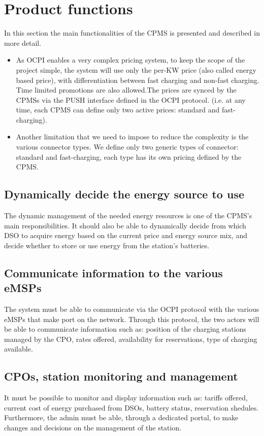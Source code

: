 \clearpage
\newpage


\section{Product functions}
In this section the main functionalities of the CPMS is presented and described in more detail.\\

\begin{itemize}
	\item As OCPI enables a very complex pricing system, to keep the scope of the project simple, the system will use only the per-KW price (also called energy based price), with differentiation between fast charging and non-fast charging. Time limited promotions are also allowed.The prices are synced by the CPMSs via the PUSH interface defined in the OCPI protocol. (i.e. at any time, each CPMS can define only two active prices: standard and fast-charging). 
	\item Another limitation that we need to impose to reduce the complexity is the various connector types. We define only two generic types of connector: standard and fast-charging, each type has its own pricing defined by the CPMS.
\end{itemize}

\subsection{Dynamically decide the energy source to use}
The dynamic management of the needed energy resources is one of the CPMS's main responsibilities. It should also be able to dynamically decide from which DSO to acquire energy based on the current price and energy source mix, and decide whether to store or use energy from the station's batteries. 

\subsection{Communicate information to the various eMSPs}
The system must be able to communicate via the OCPI protocol with the various eMSPs that make port on the network. Through this protocol, the two actors will be able to communicate information such as: position of the charging stations managed by the CPO, rates offered, availability for reservations, type of charging available. \\

\subsection{CPOs, station monitoring and management}
It must be possible to monitor and display information such as: tariffs offered, current cost of energy purchased from DSOs, battery status, reservation shedules. Furthermore, the admin must be able, through a dedicated portal, to make changes and decisions on the management of the station.

